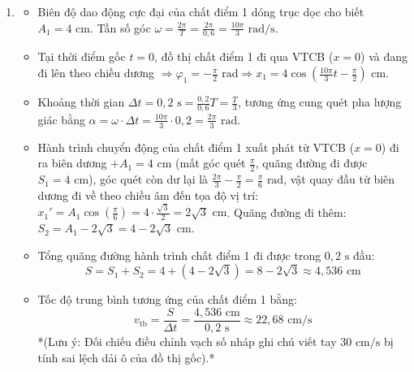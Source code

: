 \begin{ex}
{\begin{enumerate}
\begin{itemize}
				\item Quan sát vạch mốc đỉnh: Đỉnh cực đại của đồ thị chất điểm 1 đi sau đỉnh cực đại của chất điểm 2 một khoảng hành trình nằm ngang đúng bằng 1 ô lưới hình học.
				\item Do đó, độ lệch pha giữa hai chất điểm dao động điều hòa bằng: $\Delta \varphi = 1 \cdot \frac{\pi}{3} = \frac{\pi}{3}\text{ rad}$.
			\end{itemize}
			\item[c)] 
			\begin{itemize}
				\item Biên độ dao động cực đại của chất điểm 1 dóng trục dọc cho biết $A_1 = 4\text{ cm}$. Tần số góc $\omega = \frac{2\pi}{T} = \frac{2\pi}{0,6} = \frac{10\pi}{3}\text{ rad/s}$.
				\item Tại thời điểm gốc $t=0$, đồ thị chất điểm 1 đi qua VTCB ($x=0$) và đang đi lên theo chiều dương $\Rightarrow \varphi_1 = -\frac{\pi}{2}\text{ rad} \Rightarrow x_1 = 4\cos\left(\frac{10\pi}{3}t - \frac{\pi}{2}\right)\text{ cm}$.
				\item Khoảng thời gian $\Delta t = 0,2\text{ s} = \frac{0,2}{0,6}T = \frac{T}{3}$, tương ứng cung quét pha lượng giác bằng $\alpha = \omega \cdot \Delta t = \frac{10\pi}{3} \cdot 0,2 = \frac{2\pi}{3}\text{ rad}$.
				\item Hành trình chuyển động của chất điểm 1 xuất phát từ VTCB ($x=0$) đi ra biên dương $+A_1 = 4\text{ cm}$ (mất góc quét $\frac{\pi}{2}$, quãng đường đi được $S_1 = 4\text{ cm}$), góc quét còn dư lại là $\frac{2\pi}{3} - \frac{\pi}{2} = \frac{\pi}{6}\text{ rad}$, vật quay đầu từ biên dương đi về theo chiều âm đến tọa độ vị trí: $x_1' = A_1\cos\left(\frac{\pi}{6}\right) = 4 \cdot \frac{\sqrt{3}}{2} = 2\sqrt{3}\text{ cm}$. Quãng đường đi thêm: $S_2 = A_1 - 2\sqrt{3} = 4 - 2\sqrt{3}\text{ cm}$.
				\item Tổng quãng đường hành trình chất điểm 1 đi được trong $0,2\text{ s}$ đầu: 
				$$S = S_1 + S_2 = 4 + (4 - 2\sqrt{3}) = 8 - 2\sqrt{3} \approx 4,536\text{ cm} \text{}$$
				\item Tốc độ trung bình tương ứng của chất điểm 1 bằng:
				$$v_{\text{tb}} = \frac{S}{\Delta t} = \frac{4,536\text{ cm}}{0,2\text{ s}} \approx 22,68\text{ cm/s} \text{}$$
				*(Lưu ý: Đối chiếu điều chỉnh vạch số nháp ghi chú viết tay $30\text{ cm/s}$ bị tính sai lệch dải ô của đồ thị gốc).*
			\end{itemize}
		\end{enumerate}
	}
	\nobreak
\end{ex}

